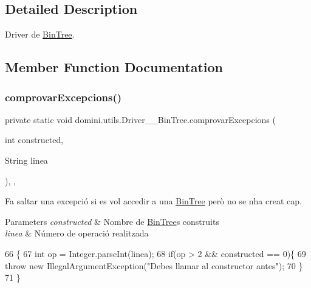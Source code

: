 \subsection{Detailed Description}
Driver de \hyperlink{classdomini_1_1utils_1_1BinTree}{Bin\+Tree}. 

\subsection{Member Function Documentation}
\mbox{\label{classdomini_1_1utils_1_1Driver____BinTree_a06b6edeb965f3677c7ebb085d512f568}} 
\subsubsection{\texorpdfstring{comprovar\+Excepcions()}{comprovarExcepcions()}}
{\footnotesize\ttfamily private static void domini.\+utils.\+Driver\+\_\+\+\_\+\+Bin\+Tree.\+comprovar\+Excepcions (\begin{DoxyParamCaption}\item[{int}]{constructed,  }\item[{String}]{linea }\end{DoxyParamCaption})\hspace{0.3cm}{\ttfamily [inline]}, {\ttfamily [static]}, {\ttfamily [private]}}



Fa saltar una excepció si es vol accedir a una \hyperlink{classdomini_1_1utils_1_1BinTree}{Bin\+Tree} però no se n\textquotesingle{}ha creat cap. 


\begin{DoxyParams}{Parameters}
{\em constructed} & Nombre de \hyperlink{classdomini_1_1utils_1_1BinTree}{Bin\+Tree}\textquotesingle{}s construits \\
\hline
{\em linea} & Número de operació realitzada \\
\hline
\end{DoxyParams}

\begin{DoxyCode}
66                                                                           \{
67         \textcolor{keywordtype}{int} op = Integer.parseInt(linea);
68         \textcolor{keywordflow}{if}(op > 2 && constructed == 0)\{
69             \textcolor{keywordflow}{throw} \textcolor{keyword}{new} IllegalArgumentException(\textcolor{stringliteral}{"Debes llamar al constructor antes"});
70         \}
71     \}
\end{DoxyCode}
\mbox{\label{classdomini_1_1utils_1_1Driver____BinTree_a08875cef02b7a770a105b0b6b976a681}} 
